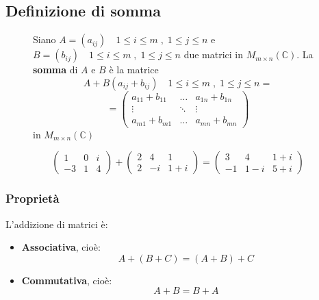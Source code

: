 \documentclass[a4paper]{article}
\theoremstyle{break}
\theoremstyle{break}
\theoremstyle{break}
\theoremstyle{break}
\begin{document}
\subsection{Definizione di somma}
\begin{figure}[H]
\begin{definition}
Siano \( A=(a_{ij}) \quad 1 \le i \le m \; , \; 1 \le j \le n \) e 
\( B=(b_{ij}) \quad 1 \le i \le m \; , \; 1 \le j \le n \) due matrici in \( M_{m \times n}(\mathbb{C}) \).
La \textbf{somma} di \( A \) e \( B \) è la matrice \[
  A + B (a_{ij} + b_{ij}) \quad 1 \le i \le m\;,\;1 \le j \le n  = 
\] 
\[
  = \begin{pmatrix} 
    a_{11} + b_{11} & \ldots & a_{1n} + b_{1n} \\
    \vdots          & \ddots & \vdots          \\
    a_{m1} + b_{m1} & \ldots & a_{mn} + b_{mn}
  \end{pmatrix} 
\] 
in \( M_{m \times n}(\mathbb{C}) \) 
\end{definition}
\end{figure}
\begin{figure}[H]
\begin{example}
\[
  \begin{pmatrix} 
    1 & 0 & i \\
    -3 & 1 & 4
  \end{pmatrix} 
  +
  \begin{pmatrix} 
    2 & 4 & 1 \\
    2 & -i & 1+i 
  \end{pmatrix} 
  =
  \begin{pmatrix} 
    3 & 4 & 1+i \\
    -1 & 1-i & 5+i
  \end{pmatrix}
\]
\end{example}
\end{figure}

\subsubsection{Proprietà}
L'addizione di matrici è:
\begin{itemize}
\item \textbf{Associativa}, cioè:
\[
  A + (B + C) = (A + B) + C
\] 
\item \textbf{Commutativa}, cioè:
\[
  A + B = B + A
\]
\end{itemize}
\end{document}
